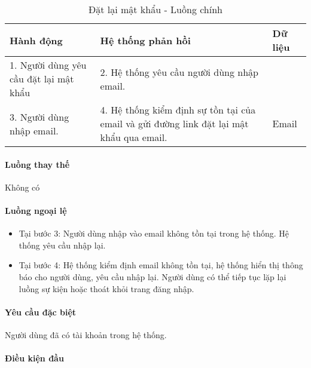 \documentclass[./../main.tex]{subfiles}
\begin{document}
\begin{table}[H]
  \caption{Đặt lại mật khẩu - Luồng chính}
  \label{tab:reset_password}
  \begin{tabularx}{\textwidth}{|X|X|X|}
  \hline
  \textbf{Hành động}                  & \textbf{Hệ thống phản hồi}                                                            & \textbf{Dữ liệu} \\ \hline
  1. Người dùng yêu cầu đặt lại mật khẩu & 2. Hệ thống yêu cầu người dùng nhập email.                                               &                  \\ \hline
  3. Người dùng nhập email.              & 4. Hệ thống kiểm định sự tồn tại của email và gửi đường link đặt lại mật khẩu qua email. & Email           \\ \hline
  \end{tabularx}
\end{table}

\paragraph*{Luồng thay thế} Không có

\paragraph*{Luồng ngoại lệ}

\begin{itemize}
\item
  
  Tại bước 3: Người dùng nhập vào email không tồn tại trong hệ thống. Hệ
  thống yêu cầu nhập lại.
  
\item
  
  Tại bước 4: Hệ thống kiểm định email không tồn tại, hệ thống hiển thị
  thông báo cho người dùng, yêu cầu nhập lại. Người dùng có thể tiếp tục
  lặp lại luồng sự kiện hoặc thoát khỏi trang đăng nhập.
  
\end{itemize}

\paragraph*{Yêu cầu đặc biệt}

Người dùng đã có tài khoản trong hệ thống.

\paragraph*{Điều kiện đầu}
\end{document}
